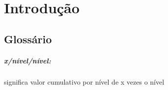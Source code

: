 \chapter{Introdução}
\section{Glossário}
\paragraph{x/nível/nível:} significa valor cumulativo por nível de x vezes o nível
 
